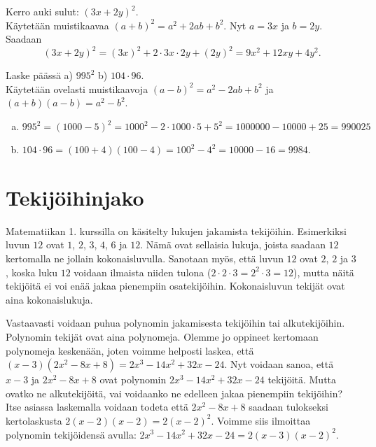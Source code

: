 \begin{esimerkki}
Kerro auki sulut: $(3x+2y)^2$. \\
Käytetään muistikaavaa $(a+b)^2 = a^2+2ab+b^2$. Nyt $a = 3x$ ja $b = 2y$.
Saadaan
        \[ (3x+2y)^2 = (3x)^2+2\cdot 3x\cdot 2y+(2y)^2 = 9x^2+12xy+4y^2. \]
\end{esimerkki}

\begin{esimerkki}
Laske päässä a) $995^2$ b) $104 \cdot 96$. \\
Käytetään ovelasti muistikaavoja $(a-b)^2 = a^2-2ab+b^2$ ja $(a+b)(a-b) = a^2-b^2$.
\begin{enumerate}[a)]
\item $995^2 = (1000-5)^2 = 1000^2-2\cdot 1000\cdot 5+5^2 = 1000000-10000+25 = 990025 $
\item $104\cdot 96 = (100+4)(100-4) = 100^2 - 4^2 = 10000 - 16 = 9984$.
\end{enumerate}
\end{esimerkki}






\section{Tekijöihinjako}

Matematiikan 1. kurssilla on käsitelty lukujen jakamista tekijöihin.
Esimerkiksi luvun $12$  ovat $1$, $2$, $3$, $4$, $6$ ja $12$. Nämä ovat sellaisia
lukuja, joista saadaan $12$ kertomalla ne jollain kokonaisluvulla. Sanotaan myös, että luvun $12$
 ovat $2$, $2$ ja $3$, koska luku $12$ voidaan
ilmaista niiden tulona ($2\cdot 2\cdot 3 = 2^2\cdot 3 = 12$), mutta näitä tekijöitä ei
voi enää jakaa pienempiin osatekijöihin. Kokonaisluvun tekijät ovat aina kokonaislukuja.

Vastaavasti voidaan puhua polynomin jakamisesta tekijöihin tai alkutekijöihin. Polynomin tekijät
ovat aina polynomeja. Olemme jo oppineet kertomaan polynomeja keskenään,
joten voimme helposti laskea, että $(x-3)(2x^2-8x+8)=2x^3-14x^2+32x-24$.
Nyt voidaan sanoa, että $x-3$ ja $2x^2-8x+8$ ovat polynomin $2x^3-14x^2+32x-24$ tekijöitä.
Mutta ovatko ne alkutekijöitä, vai voidaanko ne edelleen jakaa pienempiin tekijöihin?
Itse asiassa laskemalla voidaan todeta että $2x^2-8x+8$ saadaan tulokseksi kertolaskusta $2(x-2)(x-2)=2(x-2)^2$.
Voimme siis ilmoittaa polynomin tekijöidensä avulla: $2x^3-14x^2+32x-24=2(x-3)(x-2)^2$.

